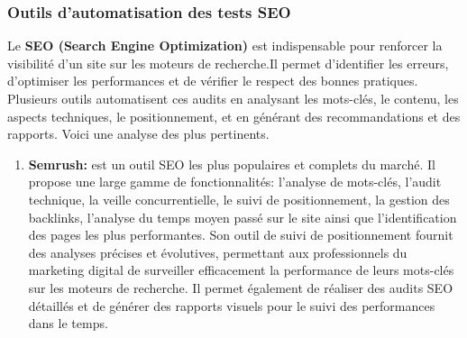 \begin{justify}
    \subsubsection{Outils d’automatisation des tests SEO}
        Le \textbf{SEO (Search Engine Optimization)} est indispensable pour renforcer la visibilité d’un site sur les moteurs de recherche.Il permet d’identifier les erreurs, d’optimiser les performances et de vérifier le respect des bonnes pratiques. Plusieurs outils automatisent ces audits en analysant les mots-clés, le contenu, les aspects techniques, le positionnement, et en générant des recommandations et des rapports. Voici une analyse des plus pertinents.  
        \begin{enumerate}[label=\alph*)]
            \item \textbf{Semrush\cite{seoTools}:} est un outil SEO les plus populaires et complets du marché. Il propose une large gamme de fonctionnalités: l’analyse de mots-clés, l’audit technique, la veille concurrentielle, le suivi de positionnement, la gestion des backlinks, l’analyse du temps moyen passé sur le site ainsi que l’identification des pages les plus performantes. Son outil de suivi de positionnement fournit des analyses précises et évolutives, permettant aux professionnels du marketing digital de surveiller efficacement la performance de leurs mots-clés sur les moteurs de recherche. Il permet également de réaliser des audits SEO détaillés et de générer des rapports visuels pour le suivi des performances dans le temps.


\end{enumerate}
\end{justify}
